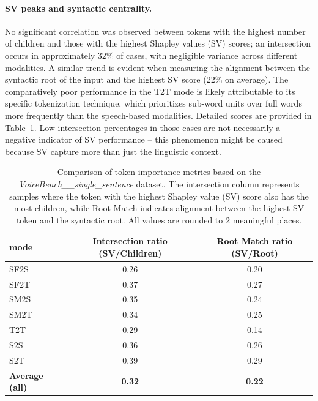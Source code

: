 \paragraph{SV peaks and syntactic centrality.}
No significant correlation was observed between tokens with the highest number of children and those with the highest Shapley values (SV) scores; an intersection occurs in approximately $32\%$ of cases, with negligible variance across different modalities. A similar trend is evident when measuring the alignment between the syntactic root of the input and the highest SV score ($22\%$ on average).
The comparatively poor performance in the T2T mode is likely attributable to its specific tokenization technique, which prioritizes sub-word units over full words more frequently than the speech-based modalities. Detailed scores are provided in Table~\ref{tab:experiments__multi_modal_context__results__combined_analysis}. Low intersection percentages in those cases are not necessarily a negative indicator of SV performance -- this phenomenon might be caused because SV capture more than just the linguistic context.

\begin{table}[h!]
\centering
\caption{Comparison of token importance metrics based on the \textit{VoiceBench\_\_single\_sentence} dataset. The intersection column represents samples where the token with the highest Shapley value (SV) score also has the most children, while Root Match indicates alignment between the highest SV token and the syntactic root. All values are rounded to $2$ meaningful places.}
\begin{tabular}{lcc}
\hline
\textbf{mode} & \textbf{Intersection ratio (SV/Children)} & \textbf{Root Match ratio (SV/Root)} \\ \hline
SF2S & 0.26 & 0.20 \\
SF2T & 0.37 & 0.27 \\
SM2S & 0.35 & 0.24 \\
SM2T & 0.34 & 0.25 \\ \hline
T2T  & 0.29 & 0.14 \\
S2S  & 0.36 & 0.26 \\
S2T  & 0.39 & 0.29 \\ \hline
\textbf{Average (all)} & \textbf{0.32} & \textbf{0.22} \\ \hline
\end{tabular}
\label{tab:experiments__multi_modal_context__results__combined_analysis}
\end{table}

